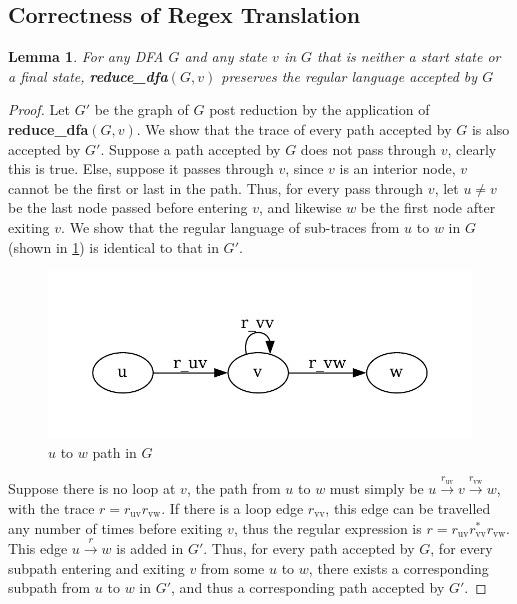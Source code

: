 \documentclass[preprint,12pt]{elsarticle}
\newtheorem{lemma}{Lemma}[section]
\theoremstyle{definition}
\theoremstyle{remark}
\begin{document}
\subsection{Correctness of Regex Translation}
\begin{lemma}
    For any DFA $G$ and any state $v$ in $G$ that is neither a start state or a final state, \textbf{reduce\_dfa}$(G, v)$ preserves the regular language accepted by $G$
\end{lemma}
\begin{proof}
    Let $G'$ be the graph of $G$ post reduction by the application of \textbf{reduce\_dfa}$(G, v)$. We show that the trace of every path accepted by $G$ is also accepted by $G'$. Suppose a path accepted by $G$ does not pass through $v$, clearly this is true. Else, suppose it passes through $v$, since $v$ is an interior node, $v$ cannot be the first or last in the path. Thus, for every pass through $v$, let $u\neq v$ be the last node passed before entering $v$, and likewise $w$ be the first node after exiting $v$. We show that the regular language of sub-traces from $u$ to $w$ in $G$ (shown in \cref{fig:uvw-dfa}) is identical to that in $G'$.
    \begin{figure}[h!]
        \centering
        \includegraphics[scale=0.75]{img/uvw_dfa.pdf}
        \caption{$u$ to $w$ path in $G$}
        \label{fig:uvw-dfa}
    \end{figure}
    Suppose there is no loop at $v$, the path from $u$ to $w$ must simply be $u\xrightarrow{r_\mathrm{uv}}v\xrightarrow{r_\mathrm{vw}}w$, with the trace $r=r_\mathrm{uv}r_\mathrm{vw}$. If there is a loop edge $r_\mathrm{vv}$, this edge can be travelled any number of times before exiting $v$, thus the regular expression is $r=r_\mathrm{uv}r_\mathrm{vv}^*r_\mathrm{vw}$. This edge $u\xrightarrow{r}w$ is added in $G'$. Thus, for every path accepted by $G$, for every subpath entering and exiting $v$ from some $u$ to $w$, there exists a corresponding subpath from $u$ to $w$ in $G'$, and thus a corresponding path accepted by $G'$.
\end{proof}
\end{document}
